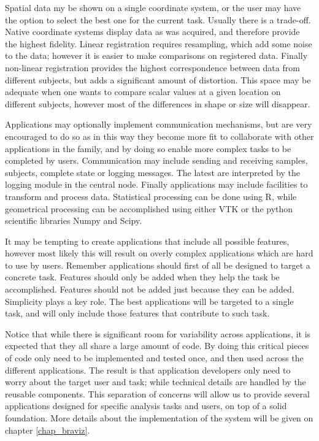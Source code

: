 Spatial data my be shown on a single coordinate system, or the user may have the option to select the best one for the current task. Usually there is a trade-off. Native coordinate systems display data as was acquired, and therefore provide the highest fidelity. Linear registration requires resampling, which add some noise to the data; however it is easier to make comparisons on registered data. Finally non-linear registration provides the highest correspondence between data from different subjects, but adds a significant amount of distortion. This space may be adequate when one wants to compare scalar values at a given location on different subjects, however most of the differences in shape or size will disappear.

Applications may optionally implement communication mechanisms, but are very encouraged to do so as in this way they become more fit to collaborate with other applications in the family, and by doing so enable more complex tasks to be completed by users. Communication may include sending and receiving samples, subjects, complete state or logging messages. The latest are interpreted by the logging module in the central node. Finally applications may include facilities to transform and process data. Statistical processing can be done using R, while geometrical processing can be accomplished using either VTK or the python scientific libraries Numpy and Scipy. 

It may be tempting to create applications that include all possible features, however most likely this will result on overly complex applications which are hard to use by users. Remember applications should first of all be designed to target a concrete task. Features should only be added when they help the task be accomplished. Features should not be added just because they can be added. Simplicity plays a key role. The best applications will be targeted to a single task, and will only include those features that contribute to such task. 

Notice that while there is significant room for variability across applications, it is expected that they all share a large amount of code. By doing this critical pieces of code only need to be implemented and tested once, and then used across the different applications. The result is that application developers only need to worry about the target user and task; while technical details are handled by the reusable components. This separation of concerns will allow us to provide several applications designed for specific analysis tasks and users, on top of a solid foundation. More details about the implementation of the system will be given on chapter \ref{chap_braviz}.


%
%

